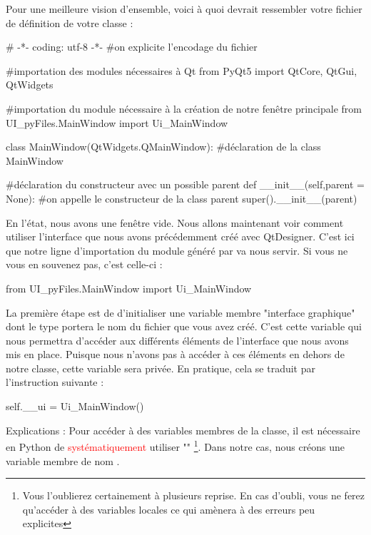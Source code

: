 

Pour une meilleure vision d'ensemble, voici à quoi devrait ressembler votre fichier de définition de votre classe  :
\begin{pyCode}
# -*- coding: utf-8 -*-
#on explicite l’encodage du fichier

#importation des modules nécessaires à Qt
from PyQt5 import QtCore, QtGui, QtWidgets

#importation du module nécessaire à la création de notre fenêtre principale
from UI_pyFiles.MainWindow import Ui_MainWindow

class MainWindow(QtWidgets.QMainWindow): #déclaration de la class MainWindow

	#déclaration du constructeur avec un possible parent
	def __init__(self,parent = None):
		#on appelle le constructeur de la class parent
		super().__init__(parent)
\end{pyCode}
\smallSkip
En l'état, nous avons une fenêtre vide. Nous allons maintenant voir comment utiliser l'interface que nous avons précédemment créé avec QtDesigner.\newline
C'est ici que notre ligne d'importation du module généré par  va nous servir. Si vous ne vous en souvenez pas, c'est celle-ci :
\begin{pyCode}
from UI_pyFiles.MainWindow import Ui_MainWindow
\end{pyCode}
La première étape est de d'initialiser une variable membre "interface graphique" dont le type portera le nom du fichier  que vous avez créé.\newline
C'est cette variable qui nous permettra d'accéder aux différents éléments de l'interface que nous avons mis en place.\newline
Puisque nous n'avons pas à accéder à ces éléments en dehors de notre classe, cette variable sera privée.\newline
En pratique, cela se traduit par l'instruction suivante :
\begin{pyCode}
self.__ui = Ui_MainWindow()
\end{pyCode}
Explications : 
Pour accéder à des variables membres de la classe, il est nécessaire en Python de \textcolor{red}{systématiquement} utiliser "\textcolor{blue}{}"
\footnote{Vous l'oublierez certainement à plusieurs reprise. En cas d'oubli, vous ne ferez qu'accéder à des variables locales ce qui amènera à des erreurs peu explicites}. Dans notre cas, nous créons une variable membre de nom .\newline
